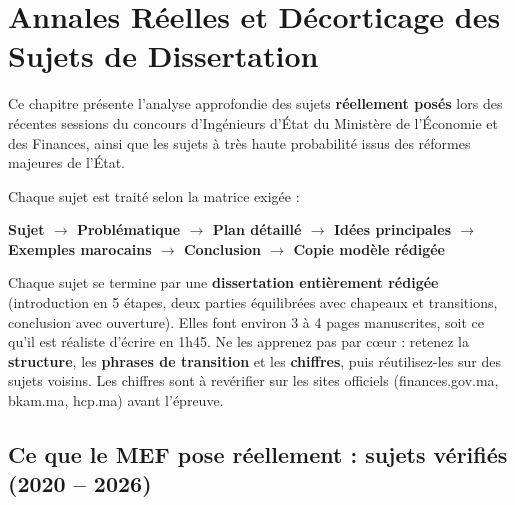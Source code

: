 \chapter{Annales Réelles et Décorticage des Sujets de Dissertation}

Ce chapitre présente l'analyse approfondie des sujets \textbf{réellement posés} lors des récentes sessions du concours d'Ingénieurs d'État du Ministère de l'Économie et des Finances, ainsi que les sujets à très haute probabilité issus des réformes majeures de l'État.

Chaque sujet est traité selon la matrice exigée :
\begin{center}
\textbf{Sujet $\longrightarrow$ Problématique $\longrightarrow$ Plan détaillé $\longrightarrow$ Idées principales $\longrightarrow$ Exemples marocains $\longrightarrow$ Conclusion $\longrightarrow$ Copie modèle rédigée}
\end{center}

\begin{tcolorbox}[colback=yellow!5!white,colframe=orange!75!black,title=\textbf{Comment utiliser les copies modèles}]
Chaque sujet se termine par une \textbf{dissertation entièrement rédigée} (introduction en 5 étapes, deux parties équilibrées avec chapeaux et transitions, conclusion avec ouverture). Elles font environ 3 à 4 pages manuscrites, soit ce qu'il est réaliste d'écrire en 1h45. Ne les apprenez pas par cœur : retenez la \textbf{structure}, les \textbf{phrases de transition} et les \textbf{chiffres}, puis réutilisez-les sur des sujets voisins. Les chiffres sont à revérifier sur les sites officiels (finances.gov.ma, bkam.ma, hcp.ma) avant l'épreuve.
\end{tcolorbox}

\section*{Ce que le MEF pose réellement : sujets vérifiés (2020 -- 2026)}

